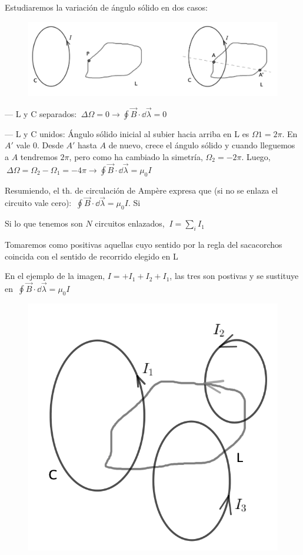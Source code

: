 Estudiaremos la variación de ángulo sólido en dos casos: 

\begin{figure}[H]
	\centering
	\includegraphics[width=.9\textwidth]{imagenes/imagenes27/T27IM03.png}
\end{figure}


--- L y C separados: $\ \Delta \Omega=0 \to \displaystyle \oint \vec B \cdot \dd \vec \lambda=0$

--- L y C unidos: Ángulo sólido inicial al subier hacia arriba en L es $\Omega1=2\pi$. En $A'$ vale $0$. Desde $A'$ hasta $A$ de nuevo, crece el ángulo sólido y cuando lleguemos a $A$ tendremos $2\pi$, pero como ha cambiado la simetría, $\Omega_2=-2\pi$. Luego,
$\ \Delta \Omega=\Omega_2-\Omega_1=-4\pi \to \displaystyle \oint \vec B \cdot \dd \vec \lambda = \mu_0 I$

Resumiendo, el th. de circulación de Ampère expresa que (si no se enlaza el circuito vale cero):
$\  \displaystyle \oint \vec B \cdot \dd \vec \lambda = \mu_0 I$. Si

Si lo que tenemos son $N$ circuitos enlazados, $\ I=\sum_i I_1$
\begin{multicols}{2}
Tomaremos como positivas aquellas cuyo sentido por la regla del sacacorchos coincida con el sentido de recorrido elegido en L

En el ejemplo de la imagen, $I=+I_1+I_2+I_1$, las tres son postivas y
se sustituye en $\  \displaystyle \oint \vec B \cdot \dd \vec \lambda = \mu_0 I$
\begin{figure}[H]
	\centering
	\includegraphics[width=.3\textwidth]{imagenes/imagenes27/T27IM04.png}
\end{figure}	
\end{multicols}

